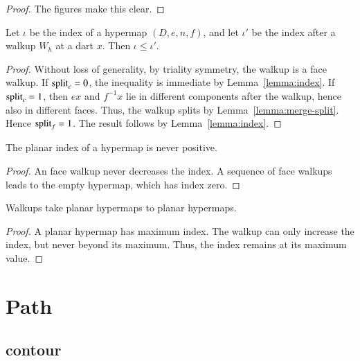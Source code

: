 \begin{proof} The figures make this clear.
\end{proof}

\begin{lemma}
Let $\iota$ be the index of a hypermap $(D,e,n,f)$, and let $\iota'$
be the index after a walkup $W_h$ at a dart $x$.  Then $\iota \le
\iota'$.
\end{lemma} 


\begin{proof} Without loss of generality, by triality symmetry, the
walkup is a face walkup.  If ${\operatorname{split}}_c=0$, the inequality is
immediate by Lemma~\ref{lemma:index}.  If ${\operatorname{split}}_c=1$, 
then $e x$ and $f^{-1} x$ lie in
different components after the walkup, hence also in different
faces.  Thus, the walkup splits by Lemma~\ref{lemma:merge-split}.
Hence  ${\operatorname{split}}_f = 1$.  The result
follows by Lemma~\ref{lemma:index}.
\end{proof}


\begin{lemma}  
The planar index
of a hypermap is never positive.
\end{lemma}

\begin{proof}  An face walkup never decreases the index.  A sequence
of face walkups leads to the empty hypermap, which has
index zero.
\end{proof}


\begin{lemma}
Walkups take planar hypermaps to planar
hypermaps.
\end{lemma}

\begin{proof}  
A planar hypermap has maximum index.  The walkup
can only increase the index, but never beyond its maximum.  
Thus, the index remains at its maximum value.
\end{proof}





\section{Path}

\subsection{contour}

